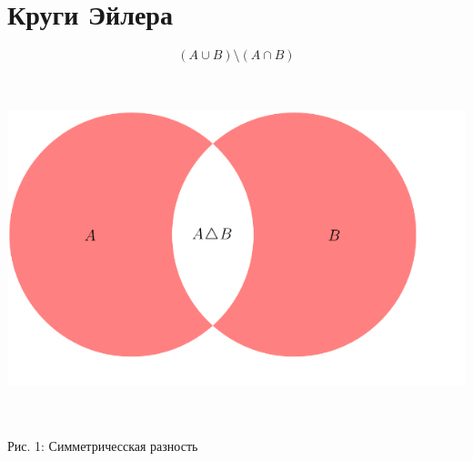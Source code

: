 \section{Круги Эйлера}

{\color{red}\[(A \cup B) \setminus (A \cap B)\]}

\includegraphics[width=17cm, height=10cm]{setPicture.png}
\begin{center}
Рис. 1: Симметричесская разность
\end{center}

\endinput